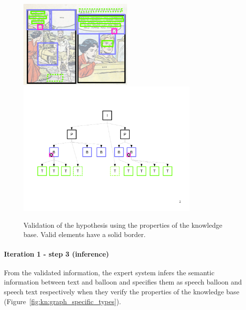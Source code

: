  \begin{figure}[!ht]  %
   \centering
   \includegraphics[trim= 0px 0px 0px 0px, clip, width=0.5\textwidth]{process_illustration_valid_1.png}\\
  \includegraphics[trim= 30px 168px 20px 110px, clip, width=0.8\textwidth]{graph_valid_1.pdf}
  \caption[Validation of the hypothesis using the properties of the knowledge base]{Validation of the hypothesis using the properties of the knowledge base. Valid elements have a solid border.}
  \label{fig:kn:graph_valid_initial}
 \end{figure}

\paragraph{Iteration 1 - step 3 (inference)} %
\label{par:step_3}
From the validated information, the expert system infers the semantic information between text and balloon and specifies them as speech balloon and speech text respectively when they verify the properties of the knowledge base (Figure~\ref{fig:kn:graph_specific_types}). 

